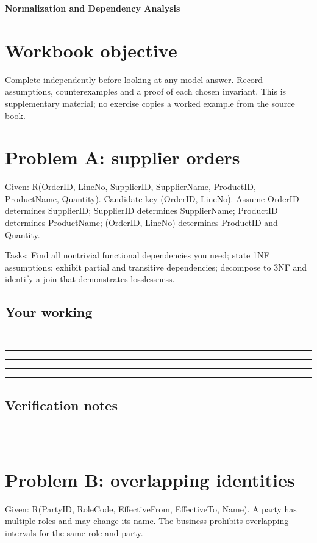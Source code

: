 \documentclass[11pt,letterpaper]{article}
\newcommand{\ResponseLine}{\par\vspace{1.05em}\noindent\rule{\linewidth}{0.4pt}\par}
\newcommand{\ResponseArea}{\ResponseLine\ResponseLine\ResponseLine}
\begin{document}
\begin{center}
{\LARGE\bfseries\color{navy} Normalization and Dependency Analysis}\par
\vspace{0.25em}{\large Guided workbook | conceptual and operational analysis}\par
{}
\end{center}
\vspace{0.8em}
\section{Workbook objective}
Complete independently before looking at any model answer. Record assumptions, counterexamples and a proof of each chosen invariant. This is supplementary material; no exercise copies a worked example from the source book.


\section{Problem A: supplier orders}
Given: R(OrderID, LineNo, SupplierID, SupplierName, ProductID, ProductName, Quantity). Candidate key (OrderID, LineNo). Assume OrderID determines SupplierID; SupplierID determines SupplierName; ProductID determines ProductName; (OrderID, LineNo) determines ProductID and Quantity.

Tasks: Find all nontrivial functional dependencies you need; state 1NF assumptions; exhibit partial and transitive dependencies; decompose to 3NF and identify a join that demonstrates losslessness.

\subsection{Your working}
\ResponseArea\ResponseArea
\subsection{Verification notes}
\ResponseArea

\section{Problem B: overlapping identities}
Given: R(PartyID, RoleCode, EffectiveFrom, EffectiveTo, Name). A party has multiple roles and may change its name. The business prohibits overlapping intervals for the same role and party.
\end{document}
